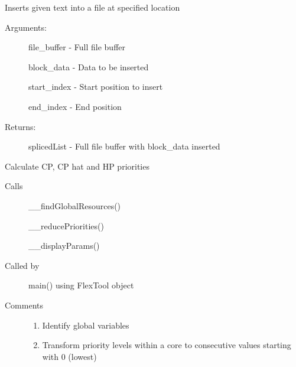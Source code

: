 \documentclass[letterpaper,10pt,english]{sphinxmanual}
\begin{document}
\begin{fulllineitems}
\begin{fulllineitems}
\end{fulllineitems}


\begin{fulllineitems}
\label{\detokenize{code:FlexTool.FlexTool._FlexTool__spliceTextToFileBuffer}}
Inserts given text into a file at specified location
\begin{description}
\item[{Arguments:}] \leavevmode
file\_buffer - Full file buffer

block\_data - Data to be inserted

start\_index - Start position to insert

end\_index - End position

\item[{Returns:}] \leavevmode
splicedList - Full file buffer with block\_data inserted

\end{description}

\end{fulllineitems}


\begin{fulllineitems}
\label{\detokenize{code:FlexTool.FlexTool.calculatePriorities}}
Calculate CP, CP hat and HP priorities
\begin{description}
\item[{Calls}] \leavevmode{[}{]}
\_\_findGlobalResources()

\_\_reducePriorities()

\_\_displayParams()

\item[{Called by}] \leavevmode{[}{]}
main() using FlexTool object

\item[{Comments}] \leavevmode{[}{]}\begin{enumerate}
\item {} 
Identify global variables

\item {} 
Transform priority levels within a core to consecutive values starting with 0 (lowest)


\end{enumerate}
\end{description}
\end{fulllineitems}
\end{fulllineitems}
\end{document}
